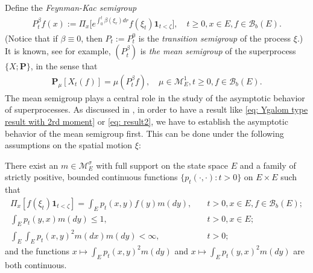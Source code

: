 	Define the \emph{Feynman-Kac semigroup}
\begin{align}
	P^\beta_tf(x)
	:= \Pi_x \big[e^{\int_0^{t} \beta(\xi_r)dr} f(\xi_t)\mathbf 1_{t<\zeta}\big],
	\quad t\geq 0, x\in E, f\in \mathscr B_b(E).
\end{align}
	(Notice that if $\beta \equiv 0$, then $P_t:= P^0_t$ is the \emph{transition semigroup} of the process $\xi$.)
	It is known, see \cite[Proposition 2.27]{Li2011Measure-valued} for example, $(P^\beta_t)$ is \emph{the mean semigroup} of the superprocess $\{X; \mathbf P\}$, in the sense that
\begin{align} \label{eq: Ygalom type result without 2rd moment}
	\mathbf P_\mu [X_t(f)]
	= \mu(P^\beta_t f),
	\quad \mu \in \mathcal M^1_E,
	t \geq 0,f \in \mathscr B_b(E).
\end{align}
    The  mean semigroup plays a central role in the study of the asymptotic behavior of superprocesses.
	As discussed in \cite{EvansPerkins1990Measure-valued}, in order to have a result like \eqref{eq: Ygalom type result with 2rd moment} or \eqref{eq: result2}, we have to establish the asymptotic behavior of the mean semigroup first.
	This can be done under the following assumptions on the spatial motion $\xi$:
\begin{asp} \label{asp: 1}
    There exist an $m \in \mathcal M_E^\sigma$ with full support on the state space $E$ and a family of strictly positive,
	bounded continuous functions $\{ p_t(\cdot,\cdot): t > 0 \}$ on $E \times E$ such that
\begin{align}
	\Pi_x[ f(\xi_t)\mathbf 1_{t < \zeta} ]
	= \int_E p_t(x,y) f(y) m(dy),
	&\quad t>0, x \in E,f \in \mathscr B_b(E);
	\\\int_E p_t(y,x)m(dy)
	\leq 1,	
	&\quad t>0,x\in E;
	\\\int_E \int_E p_t(x,y)^2 m(dx) m(dy)
	<\infty,
	&\quad t> 0;
\end{align}
	and the functions $x \mapsto \int_E p_t(x,y)^2 m(dy)$ and $x \mapsto \int_E p_t(y,x)^2 m(dy)$ are both continuous.
\end{asp}

